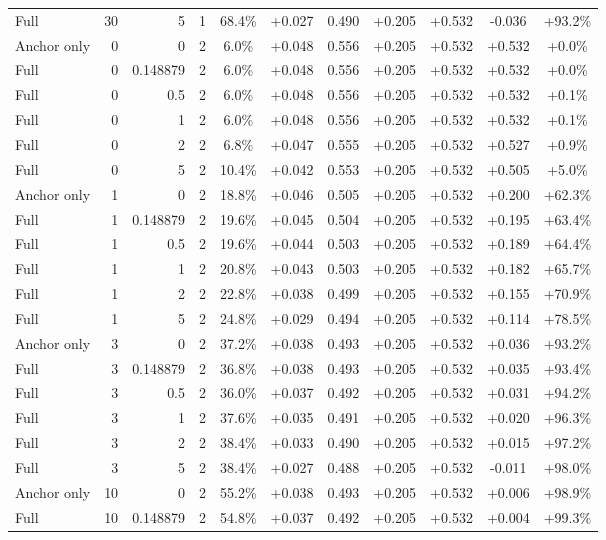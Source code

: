 \begin{table}[htbp]
\begin{tabular}{lrrrccccccc}
Full & 30 & 5 & 1 & 68.4\% & +0.027 & 0.490 & +0.205 & +0.532 & -0.036 & +93.2\% \\
Anchor only & 0 & 0 & 2 & 6.0\% & +0.048 & 0.556 & +0.205 & +0.532 & +0.532 & +0.0\% \\
Full & 0 & 0.148879 & 2 & 6.0\% & +0.048 & 0.556 & +0.205 & +0.532 & +0.532 & +0.0\% \\
Full & 0 & 0.5 & 2 & 6.0\% & +0.048 & 0.556 & +0.205 & +0.532 & +0.532 & +0.1\% \\
Full & 0 & 1 & 2 & 6.0\% & +0.048 & 0.556 & +0.205 & +0.532 & +0.532 & +0.1\% \\
Full & 0 & 2 & 2 & 6.8\% & +0.047 & 0.555 & +0.205 & +0.532 & +0.527 & +0.9\% \\
Full & 0 & 5 & 2 & 10.4\% & +0.042 & 0.553 & +0.205 & +0.532 & +0.505 & +5.0\% \\
Anchor only & 1 & 0 & 2 & 18.8\% & +0.046 & 0.505 & +0.205 & +0.532 & +0.200 & +62.3\% \\
Full & 1 & 0.148879 & 2 & 19.6\% & +0.045 & 0.504 & +0.205 & +0.532 & +0.195 & +63.4\% \\
Full & 1 & 0.5 & 2 & 19.6\% & +0.044 & 0.503 & +0.205 & +0.532 & +0.189 & +64.4\% \\
Full & 1 & 1 & 2 & 20.8\% & +0.043 & 0.503 & +0.205 & +0.532 & +0.182 & +65.7\% \\
Full & 1 & 2 & 2 & 22.8\% & +0.038 & 0.499 & +0.205 & +0.532 & +0.155 & +70.9\% \\
Full & 1 & 5 & 2 & 24.8\% & +0.029 & 0.494 & +0.205 & +0.532 & +0.114 & +78.5\% \\
Anchor only & 3 & 0 & 2 & 37.2\% & +0.038 & 0.493 & +0.205 & +0.532 & +0.036 & +93.2\% \\
Full & 3 & 0.148879 & 2 & 36.8\% & +0.038 & 0.493 & +0.205 & +0.532 & +0.035 & +93.4\% \\
Full & 3 & 0.5 & 2 & 36.0\% & +0.037 & 0.492 & +0.205 & +0.532 & +0.031 & +94.2\% \\
Full & 3 & 1 & 2 & 37.6\% & +0.035 & 0.491 & +0.205 & +0.532 & +0.020 & +96.3\% \\
Full & 3 & 2 & 2 & 38.4\% & +0.033 & 0.490 & +0.205 & +0.532 & +0.015 & +97.2\% \\
Full & 3 & 5 & 2 & 38.4\% & +0.027 & 0.488 & +0.205 & +0.532 & -0.011 & +98.0\% \\
Anchor only & 10 & 0 & 2 & 55.2\% & +0.038 & 0.493 & +0.205 & +0.532 & +0.006 & +98.9\% \\
Full & 10 & 0.148879 & 2 & 54.8\% & +0.037 & 0.492 & +0.205 & +0.532 & +0.004 & +99.3\% \\

\end{tabular}
\end{table}
